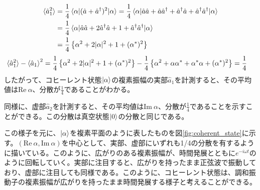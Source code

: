 \begin{equation}
\begin{aligned}
  \braket{\hat a_1^2} &= \frac{1}{4}\braket{\alpha|(\hat a + \hat a^\dagger)^2|\alpha} = \frac{1}{4}\braket{\alpha|\hat a \hat a + \hat a \hat a^\dagger + \hat a^\dagger \hat a + \hat a^\dagger \hat a^\dagger|\alpha}\\
  &= \frac 1 4 \braket{\alpha|\hat a \hat a + 2\hat a^\dagger \hat a + 1 + \hat a^\dagger \hat a^\dagger|\alpha}\\
  &= \frac{1}{4}\left\{\alpha^2 + 2|\alpha |^2 + 1 + (\alpha^*)^2\right\}
\end{aligned}
\end{equation}
\begin{equation}
	\begin{aligned}
		\braket{\hat a_1^2} - \braket{\hat a _1}^2 &= \frac{1}{4}\left\{\alpha^2 + 2|\alpha |^2 + 1 + (\alpha^*)^2\right\} - \frac{1}{4}\left\{\alpha^2 + \alpha \alpha^* + \alpha^*\alpha + (\alpha^*)^2\right\} = \frac 1 4
	\end{aligned}
\end{equation}
したがって、コヒーレント状態$\ket \alpha$の複素振幅の実部$\hat a_1$を計測すると、その平均値は$\mathrm {Re} \ \alpha$、分散が$\frac 1 4$であることがわかる。

同様に、虚部$\hat a_2$を計測すると、その平均値は$\mathrm{Im} \ \alpha$、分散が$\frac 1 4$であることを示すことができる。この分散は真空状態$\ket 0$の分散と同じである。

この様子を元に、$\ket \alpha$を複素平面のように表したものを図\ref{fig:coherent_state}に示す。$(\mathrm {Re} \ \alpha, \mathrm{Im} \ \alpha)$を中心として、実部、虚部にいずれも1/4の分散を有するように描いている。このように、広がりのある複素振幅が、時間発展とともに$e^{-i\omega t}$のように回転していく。実部に注目すると、広がりを持ったまま正弦波で振動しており、虚部に注目しても同様である。このように、コヒーレント状態は、調和振動子の複素振幅が広がりを持ったまま時間発展する様子と考えることができる。

